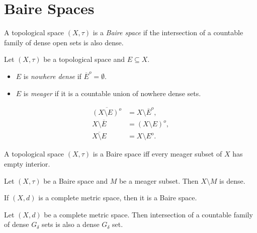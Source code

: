\documentclass[screen,single]{techreport}
\numberwithin{equation}{section}
\begin{document}
\section{Baire Spaces}

\begin{definition}\label{De:BaireSpace}
  A topological space $(X,\tau)$ is a \emph{Baire space} if the intersection of a countable family of dense open sets is also dense.
\end{definition}

\begin{definition}\label{De:NowhereDenseAndMeager}
  Let $(X,\tau)$ be a topological space and $E \subseteq X$.
  \begin{itemize}
    \item $E$ is \emph{nowhere dense} if $\overline{E}^o = \emptyset$.
    \item $E$ is \emph{meager} if it is a countable union of nowhere dense sets.
  \end{itemize}
\end{definition}

\begin{remark}\label{Rem:SeveralClosIntEqulities}
  \begin{align*}
    \overline{(X \setminus E)^o} & = X \setminus \overline{E}^o, \\
    X \setminus \overline{E} & = (X \setminus E)^o, \\
    \overline{X \setminus E} & = X \setminus E^o.
  \end{align*}
\end{remark}

\begin{proposition}\label{Prop:BaireIffMeagerSetHasEmptyInt}
  A topological space $(X,\tau)$ is a Baire space iff every meager subset of $X$ has empty interior.
\end{proposition}

\begin{corollary}\label{Cor:BaireImplyComplementOfMeagerIsDense}
  Let $(X,\tau)$ be a Baire space and $M$ be a meager subset.
  Then $X \setminus M$ is dense.
\end{corollary}

\begin{theorem}\label{The:BaireCategory}
  If $(X,d)$ is a complete metric space, then it is a Baire space.
\end{theorem}

\begin{corollary}\label{Cor:CompleteMetricIntersectDenseGDeltaIsDenseGDelta}
  Let $(X,d)$ be a complete metric space.
  Then intersection of a countable family of dense $G_\delta$ sets is also a dense $G_\delta$ set.
\end{corollary}
\end{document}
